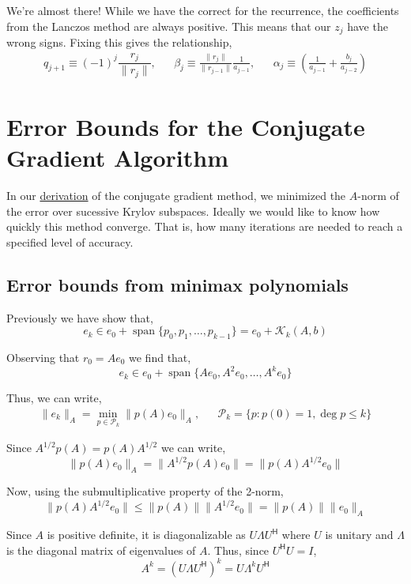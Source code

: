 \documentclass[10pt]{article}
\begin{document}
We're almost there! While we have the correct for the recurrence, the coefficients from the Lanczos method are always positive. This means that our \(z_{j}\) have the wrong signs. Fixing this gives the relationship,
\begin{align*}
q_{j+1} \equiv (-1)^j\dfrac{r_j}{\|r_j\|}
,&&
\beta_j \equiv \frac{\|r_j\|}{\|r_{j-1}\|}\frac{1}{a_{j-1}}
,&&
\alpha_j \equiv \left(\frac{1}{a_{j-1}} + \frac{b_{j}}{a_{j-2}}\right)
\end{align*}

\section{Error Bounds for the Conjugate Gradient Algorithm}

In our \href{./cg_derivation.html}{derivation} of the conjugate gradient method, we minimized the \(A\)-norm of the error over sucessive Krylov subspaces.
Ideally we would like to know how quickly this method converge.
That is, how many iterations are needed to reach a specified level of accuracy.

\subsection{Error bounds from minimax polynomials}

Previously we have show that,
\[
e_k \in e_0 + \operatorname{span}\{p_0,p_1,\ldots,p_{k-1}\} = e_0 + \mathcal{K}_k(A,b)
\]

Observing that \(r_0 = Ae_0\) we find that,
\[
e_k \in e_0 +  \operatorname{span}\{Ae_0,A^2e_0,\ldots,A^{k}e_0\}
\]

Thus, we can write,
\begin{align*}
\| e_k \|_A =  \min_{p\in\mathcal{P}_k}\|p(A)e_0\|_A
,&&
\mathcal{P}_k = \{p : p(0) = 1, \operatorname{deg} p \leq k\}    
\end{align*}

Since \(A^{1/2} p(A) = p(A)A^{1/2}\) we can write,
\[
\| p(A)e_0 \|_A
= \|A^{1/2} p(A)e_0 \|
= \|p(A) A^{1/2}e_0 \|
\]

Now, using the submultiplicative property of the 2-norm,
\[
\|p(A) A^{1/2}e_0 \|
\leq \|p(A)\| \|A^{1/2} e_0 \|
= \|p(A)\| \|e_0\|_A
\]

Since \(A\) is positive definite, it is diagonalizable as \(U\Lambda U^{\mathsf{H}}\) where \(U\) is unitary and \(\Lambda\) is the diagonal matrix of eigenvalues of \(A\).
Thus, since \(U^{\mathsf{H}}U = I\),
\[
A^k = (U\Lambda U^{\mathsf{H}})^k = U\Lambda^kU^{\mathsf{H}}
\]
\end{document}
